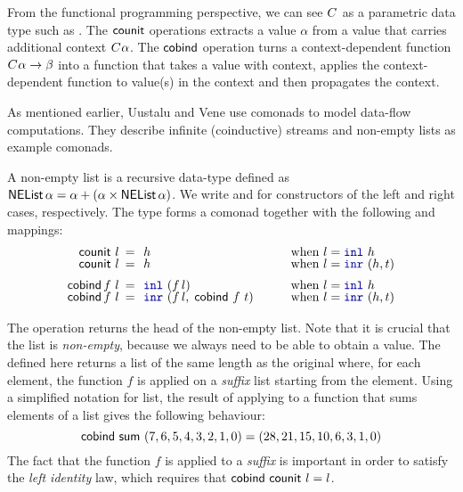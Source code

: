 \noindent
From the functional programming perspective, we can see $C^{}$ as a parametric data type such as
. The $\textnormal{\sffamily counit}$ operations extracts a value $\alpha$ from a value that carries 
additional context $C^{}\alpha$. The $\textnormal{\sffamily cobind}$ operation turns a context-dependent function 
$C^{}\alpha \rightarrow \beta$ into a function that takes a value with context, applies
the context-dependent function to value(s) in the context and then propagates the context.

As mentioned earlier, Uustalu and Vene \cite{comonads-notions} use comonads to model data-flow
computations. They describe infinite (coinductive) streams and non-empty lists as example comonads.

\begin{example}
A non-empty list is a recursive data-type defined as $\ident{NEList}\,\alpha = \alpha + (\alpha \times \ident{NEList}\,\alpha)$.
We write  and  for constructors of the left and right cases, respectively. The 
type  forms a comonad together with the following  and  mappings:
%
\begin{equation*}
\begin{array}{rclll}
\ident{counit}~l &\narrow{=}& h &\quad&\textnormal{when}~l=\kvd{inl}~h\\[-0.25em]
\ident{counit}~l &\narrow{=}& h &&\textnormal{when}~l=\kvd{inr}~(h, t)\\[0.5em]
\ident{cobind}\,f~l &\narrow{=}& \kvd{inl}~(f\,l) &&\textnormal{when}~l=\kvd{inl}~h\\[-0.25em]
\ident{cobind}\,f~l &\narrow{=}& \kvd{inr}~(f\,l,\;\ident{cobind}~f~t) &&\textnormal{when}~l=\kvd{inr}~(h, t)
\end{array}
\end{equation*}
\end{example}

\noindent
The  operation returns the head of the non-empty list. Note that it is crucial that
the list is \emph{non-empty}, because we always need to be able to obtain a value. The 
defined here returns a list of the same length as the original where, for each element, the 
function $f$ is applied on a \emph{suffix} list starting from the element. Using a simplified
notation for list, the result of applying  to a function that sums elements of a
list gives the following behaviour:
%
\begin{equation*}
\textnormal{\sffamily cobind}~\textnormal{\sffamily sum}~(7,6,5,4,3,2,1,0) = (28,21,15,10,6,3,1,0)
\end{equation*}
%
The fact that the function $f$ is applied to a \emph{suffix} is important in order to satisfy the
\emph{left identity} law, which requires that $\textnormal{\sffamily cobind}~\textnormal{\sffamily counit}~l = l$.

